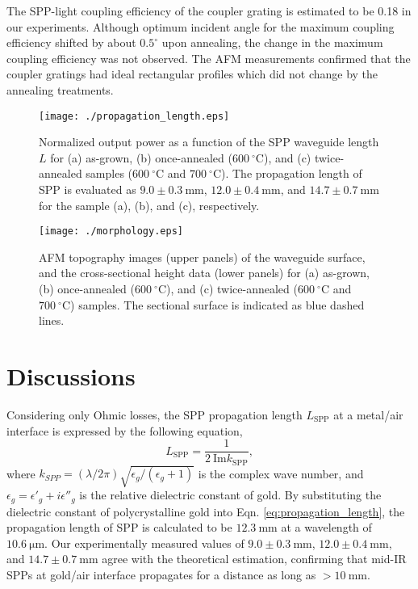 \documentclass[aip,apl,reprint]{revtex4-1}
\begin{document}
The SPP-light coupling efficiency of the coupler grating is estimated to be 0.18 in our experiments. Although optimum incident angle for the maximum coupling efficiency shifted by about $0.5^\circ$ upon annealing, the change in the maximum coupling efficiency was not observed. The AFM measurements confirmed that the coupler gratings had ideal rectangular profiles which did not change by the annealing treatments. 

 \begin{figure}[htbp]
   \begin{center}
    \texttt{[image: ./propagation\_length.eps]}
    \caption{Normalized output power as a function of the SPP waveguide length $L$ for (a) as-grown, (b) once-annealed ($600\:^\circ\mathrm{C}$), and (c) twice-annealed samples ($600\:^\circ\mathrm{C}$ and $700\:^\circ\mathrm{C}$). The propagation length of SPP is evaluated as $9.0\pm0.3\:\mathrm{mm}$, $12.0\pm0.4\:\mathrm{mm}$, and $14.7\pm0.7\:\mathrm{mm}$ for the sample (a), (b), and (c), respectively.}
       \label{fig:propagation_length}
   \end{center}
\end{figure}

 \begin{figure}[htbp]
   \begin{center}
    \texttt{[image: ./morphology.eps]}
    \caption{AFM topography images (upper panels) of the waveguide surface, and the cross-sectional height data (lower panels) for (a) as-grown, (b) once-annealed ($600\:^\circ\mathrm{C}$), and (c) twice-annealed ($600\:^\circ\mathrm{C}$ and $700\:^\circ\mathrm{C}$) samples. The sectional surface is indicated as blue dashed lines. }
    \label{fig:morphology}
   \end{center}
\end{figure}

\section{Discussions}
\label{sec:discussion}
Considering only Ohmic losses, the SPP propagation length $L_{\mathrm{SPP}}$ at a metal/air interface is expressed by the following equation,
\begin{equation}
 L_{\mathrm{SPP}} = \frac{1}{2\:\mathrm{Im} k_{\mathrm{SPP}}},
\label{eq:propagation_length}
 \end{equation}
where $k_{SPP}=(\lambda/2\pi)\sqrt{\epsilon_g/(\epsilon_g+1)}$ is the complex wave number, and $\epsilon_g=\epsilon'_g+i\epsilon''_g$ is the relative dielectric constant of gold. 
By substituting the dielectric constant of polycrystalline gold\cite{Palik} into Eqn. \ref{eq:propagation_length}, the propagation length of SPP is calculated to be $12.3\:\mathrm{mm}$ at a wavelength of $10.6\:\mathrm{\mu m}$.
Our experimentally measured values of  $9.0\pm0.3\:\mathrm{mm}$, $12.0\pm0.4\:\mathrm{mm}$, and $14.7\pm0.7\:\mathrm{mm}$ agree with the theoretical estimation, confirming that mid-IR SPPs at gold/air interface propagates for a distance as long as $>10\:\mathrm{mm}$.
\end{document}
